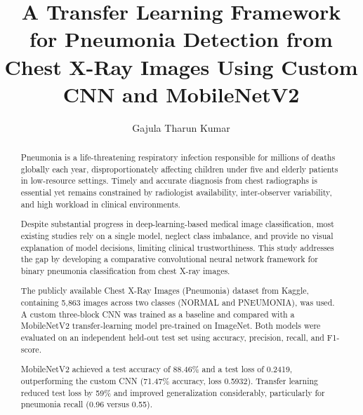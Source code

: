 \documentclass[preprint,12pt]{elsarticle}
\begin{document}
\begin{frontmatter}

\title{A Transfer Learning Framework for Pneumonia Detection from Chest X-Ray Images Using Custom CNN and MobileNetV2}

\author[label1]{Gajula Tharun Kumar}


\begin{abstract}
Pneumonia is a life-threatening respiratory infection responsible for
millions of deaths globally each year, disproportionately affecting
children under five and elderly patients in low-resource settings.
Timely and accurate diagnosis from chest radiographs is essential yet
remains constrained by radiologist availability, inter-observer
variability, and high workload in clinical environments.

Despite substantial progress in deep-learning-based medical image
classification, most existing studies rely on a single model, neglect
class imbalance, and provide no visual explanation of model decisions,
limiting clinical trustworthiness.
This study addresses the gap by developing a comparative convolutional
neural network framework for binary pneumonia classification from chest
X-ray images.

The publicly available Chest X-Ray Images (Pneumonia) dataset from
Kaggle, containing 5{,}863 images across two classes (NORMAL and
PNEUMONIA), was used.
A custom three-block CNN was trained as a baseline and compared with a
MobileNetV2 transfer-learning model pre-trained on ImageNet.
Both models were evaluated on an independent held-out test set using
accuracy, precision, recall, and F1-score.

MobileNetV2 achieved a test accuracy of 88.46\% and a test loss of
0.2419, outperforming the custom CNN (71.47\% accuracy, loss 0.5932).
Transfer learning reduced test loss by 59\% and improved generalization
considerably, particularly for pneumonia recall (0.96 versus 0.55).


\end{abstract}
\end{frontmatter}
\end{document}
